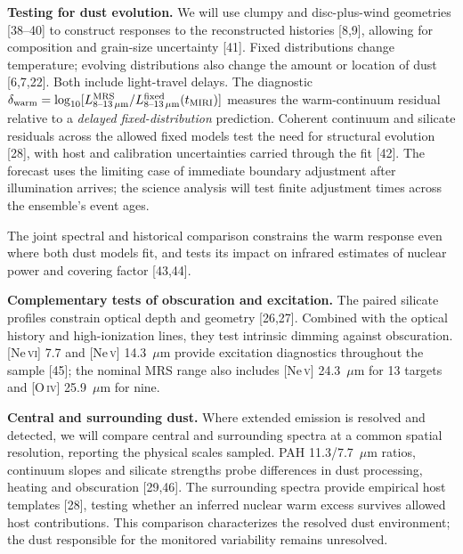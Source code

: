 \documentclass[12pt]{article}
\begin{document}
\noindent\textbf{Testing for dust evolution.}
We will use clumpy and disc-plus-wind geometries [38--40] to construct responses to the reconstructed histories [8,9], allowing for composition and grain-size uncertainty [41]. Fixed distributions change temperature; evolving distributions also change the amount or location of dust [6,7,22]. Both include light-travel delays. The diagnostic $\delta_{\rm warm}=\log_{10}[L^{\rm MRS}_{8\text{--}13\,\mu{\rm m}}/L^{\rm fixed}_{8\text{--}13\,\mu{\rm m}}(t_{\rm MIRI})]$ measures the warm-continuum residual relative to a \emph{delayed fixed-distribution} prediction. Coherent continuum and silicate residuals across the allowed fixed models test the need for structural evolution [28], with host and calibration uncertainties carried through the fit [42]. The forecast uses the limiting case of immediate boundary adjustment after illumination arrives; the science analysis will test finite adjustment times across the ensemble's event ages.

The joint spectral and historical comparison constrains the warm response even where both dust models fit, and tests its impact on infrared estimates of nuclear power and covering factor [43,44].

\noindent\textbf{Complementary tests of obscuration and excitation.}
The paired silicate profiles constrain optical depth and geometry [26,27]. Combined with the optical history and high-ionization lines, they test intrinsic dimming against obscuration. [Ne\,\textsc{vi}] 7.7 and [Ne\,\textsc{v}] 14.3~$\mu$m provide excitation diagnostics throughout the sample [45]; the nominal MRS range also includes [Ne\,\textsc{v}] 24.3~$\mu$m for 13 targets and [O\,\textsc{iv}] 25.9~$\mu$m for nine.

\noindent\textbf{Central and surrounding dust.}
Where extended emission is resolved and detected, we will compare central and surrounding spectra at a common spatial resolution, reporting the physical scales sampled. PAH 11.3/7.7~$\mu$m ratios, continuum slopes and silicate strengths probe differences in dust processing, heating and obscuration [29,46]. The surrounding spectra provide empirical host templates [28], testing whether an inferred nuclear warm excess survives allowed host contributions. This comparison characterizes the resolved dust environment; the dust responsible for the monitored variability remains unresolved.
\end{document}
